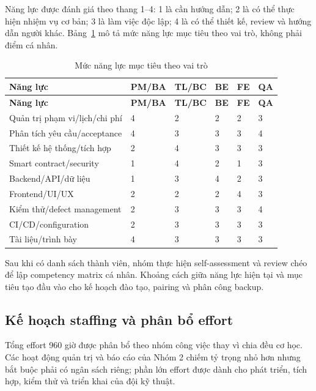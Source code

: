 Năng lực được đánh giá theo thang 1--4: 1 là cần hướng dẫn; 2 là có thể thực hiện nhiệm vụ cơ bản; 3 là làm việc độc lập; 4 là có thể thiết kế, review và hướng dẫn người khác. Bảng~\ref{tab:competency-target} mô tả mức năng lực mục tiêu theo vai trò, không phải điểm cá nhân.

\begin{longtable}{| p{4.6cm} | p{1.5cm} | p{1.5cm} | p{1.5cm} | p{1.5cm} | p{1.5cm} |}
\caption{Mức năng lực mục tiêu theo vai trò}\label{tab:competency-target}\\
\hline
\textbf{Năng lực} & \textbf{PM/BA} & \textbf{TL/BC} & \textbf{BE} & \textbf{FE} & \textbf{QA} \\
\hline
\endfirsthead
\hline
\textbf{Năng lực} & \textbf{PM/BA} & \textbf{TL/BC} & \textbf{BE} & \textbf{FE} & \textbf{QA} \\
\hline
\endhead
Quản trị phạm vi/lịch/chi phí & 4 & 2 & 2 & 2 & 3 \\ \hline
Phân tích yêu cầu/acceptance & 4 & 3 & 3 & 3 & 4 \\ \hline
Thiết kế hệ thống/tích hợp & 2 & 4 & 3 & 3 & 3 \\ \hline
Smart contract/security & 1 & 4 & 2 & 1 & 3 \\ \hline
Backend/API/dữ liệu & 1 & 3 & 4 & 2 & 3 \\ \hline
Frontend/UI/UX & 2 & 2 & 2 & 4 & 3 \\ \hline
Kiểm thử/defect management & 2 & 3 & 3 & 3 & 4 \\ \hline
CI/CD/configuration & 2 & 3 & 3 & 3 & 3 \\ \hline
Tài liệu/trình bày & 4 & 3 & 3 & 3 & 3 \\
\hline
\end{longtable}

Sau khi có danh sách thành viên, nhóm thực hiện self-assessment và review chéo để lập competency matrix cá nhân. Khoảng cách giữa năng lực hiện tại và mục tiêu tạo đầu vào cho kế hoạch đào tạo, pairing và phân công backup.

\fi
\subsection{Kế hoạch staffing và phân bổ effort}

Tổng effort 960 giờ được phân bổ theo nhóm công việc thay vì chia đều cơ học. Các hoạt động quản trị và báo cáo của Nhóm 2 chiếm tỷ trọng nhỏ hơn nhưng bắt buộc phải có ngân sách riêng; phần lớn effort được dành cho phát triển, tích hợp, kiểm thử và triển khai của đội kỹ thuật.

